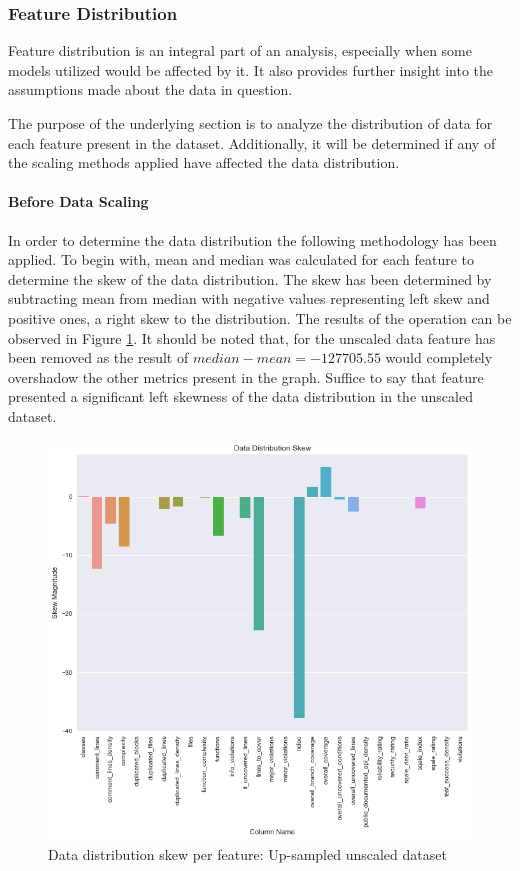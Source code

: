 \subsubsection{Feature Distribution}\label{sec:impl-data-analysis:feature-dist}
Feature distribution is an integral part of an analysis, especially when some models utilized would be affected by it. It also provides further insight into the assumptions made about the data in question.

The purpose of the underlying section is to analyze the distribution of data for each feature present in the dataset. Additionally, it will be determined if any of the scaling methods applied have affected the data distribution.

\paragraph{Before Data Scaling}\label{sec:impl-data-analysis:feature-dist-before-scaling}
In order to determine the data distribution the following methodology has been applied. 
To begin with, mean and median was calculated for each feature to determine the skew of the data distribution. The skew has been determined by subtracting mean from median with negative values representing left skew and positive ones, a right skew to the distribution. The results of the operation can be observed in Figure \ref{fig:feature-dist:skew:unmodified-upsample}. It should be noted that, for the unscaled data \fileAgeInSec{} feature has been removed as the result of $median - mean = -127705.55$ would completely overshadow the other metrics present in the graph. Suffice to say that \fileAgeInSec{} feature presented a significant left skewness of the data distribution in the unscaled dataset.

\begin{figure}[!h]
    \centering
    \includegraphics[scale=0.6]{Figures/feature-dist/Data_Distribution_Skew_unmodified_upsampled.png}
    \caption{Data distribution skew per feature: Up-sampled unscaled dataset}
    \label{fig:feature-dist:skew:unmodified-upsample}
\end{figure}

